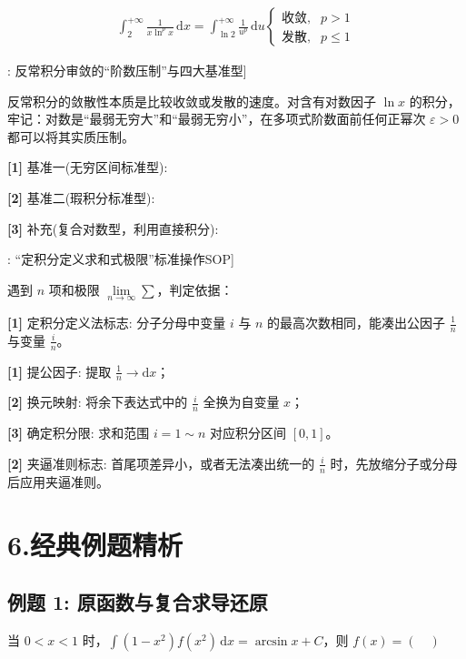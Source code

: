 \documentclass[11pt,a4paper,UTF8]{ctexart}
\begin{document}
\begin{align*}
\int_2^{+\infty} \frac{1}{x \ln^p x}\,\mathrm{d}x = \int_{\ln 2}^{+\infty} \frac{1}{u^p}\,\mathrm{d}u \begin{cases} \text{收敛}, & p > 1 \\ \text{发散}, & p \leqslant 1 \end{cases}
\end{align*}
\begin{thmbox}[方法[1]: 反常积分审敛的“阶数压制”与四大基准型]

反常积分的敛散性本质是比较收敛或发散的速度。对含有对数因子 $\ln x$ 的积分，牢记：对数是“最弱无穷大”和“最弱无穷小”，在多项式阶数面前任何正幂次 $\varepsilon > 0$ 都可以将其实质压制。

\textbf{[1]} 基准一(无穷区间标准型):


\textbf{[2]} 基准二(瑕积分标准型):


\textbf{[3]} 补充(复合对数型，利用直接积分):


\end{thmbox}
\begin{thmbox}[方法[2]: “定积分定义求和式极限”标准操作SOP]

遇到 $n$ 项和极限 $\lim\limits_{n \to \infty} \sum$，判定依据：

\textbf{[1]} 定积分定义法标志: 分子分母中变量 $i$ 与 $n$ 的最高次数相同，能凑出公因子 $\frac{1}{n}$ 与变量 $\frac{i}{n}$。

\textbf{[1]} 提公因子: 提取 $\frac{1}{n} \to \mathrm{d}x$；

\textbf{[2]} 换元映射: 将余下表达式中的 $\frac{i}{n}$ 全换为自变量 $x$；

\textbf{[3]} 确定积分限: 求和范围 $i=1 \sim n$ 对应积分区间 $[0, 1]$。

\textbf{[2]} 夹逼准则标志: 首尾项差异小，或者无法凑出统一的 $\frac{i}{n}$ 时，先放缩分子或分母后应用夹逼准则。

\end{thmbox}

\section{6.经典例题精析}


\subsection{例题 1: 原函数与复合求导还原}

当 $0 < x < 1$ 时，$\int (1-x^2)f(x^2)\,\mathrm{d}x = \arcsin x + C$，则 $f(x) = (\quad)$
\end{document}
